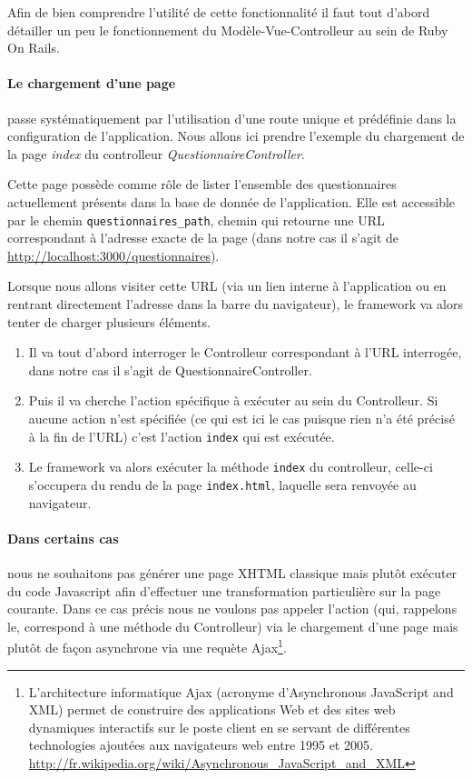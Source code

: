\documentclass[12pt,a4paper]{book}
\begin{document}
Afin de bien comprendre l'utilité de cette fonctionnalité il faut tout d'abord détailler un peu le fonctionnement du Modèle-Vue-Controlleur au sein de Ruby On Rails.

\paragraph{Le chargement d'une page} passe systématiquement par l'utilisation d'une route unique et prédéfinie dans la configuration de l'application. Nous allons ici prendre l'exemple du chargement de la page \textit{index} du controlleur \textit{QuestionnaireController}.

Cette page possède comme rôle de lister l'ensemble des questionnaires actuellement présents dans la base de donnée de l'application. Elle est accessible par le chemin \texttt{questionnaires\_path}, chemin qui retourne une URL correspondant à l'adresse exacte de la page (dans notre cas il s'agit de \url{http://localhost:3000/questionnaires}).

Lorsque nous allons visiter cette URL (via un lien interne à l'application ou en rentrant directement l'adresse dans la barre du navigateur), le framework va alors tenter de charger plusieurs éléments.

\begin{enumerate}
  \item Il va tout d'abord interroger le Controlleur correspondant à l'URL interrogée, dans notre cas il s'agit de QuestionnaireController.
  \item Puis il va cherche l'action spécifique à exécuter au sein du Controlleur. Si aucune action n'est spécifiée (ce qui est ici le cas puisque rien n'a été précisé à la fin de l'URL) c'est l'action \texttt{index} qui est exécutée.
  \item Le framework va alors exécuter la méthode \texttt{index} du controlleur, celle-ci s'occupera du rendu de la page \texttt{index.html}, laquelle sera renvoyée au navigateur.
\end{enumerate}

\paragraph{Dans certains cas} nous ne souhaitons pas générer une page XHTML classique mais plutôt exécuter du code Javascript afin d'effectuer une transformation particulière sur la page courante. Dans ce cas précis nous ne voulons pas appeler l'action (qui, rappelons le, correspond à une méthode du Controlleur) via le chargement d'une page mais plutôt de façon asynchrone via une requète Ajax\footnote{L'architecture informatique Ajax (acronyme d'Asynchronous JavaScript and XML) permet de construire des applications Web et des sites web dynamiques interactifs sur le poste client en se servant de différentes technologies ajoutées aux navigateurs web entre 1995 et 2005. \url{http://fr.wikipedia.org/wiki/Asynchronous_JavaScript_and_XML}}. 
\end{document}
